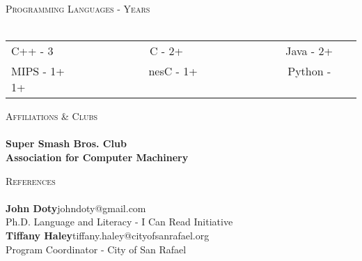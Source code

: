 \documentclass[a4paper]{article}
\newcommand{\lineunder} {
    \vspace*{-8pt} \\
    \hspace*{-18pt} \hrulefill \\
}
\newcommand{\header} [1] {
    {\hspace*{-18pt}\vspace*{6pt} \textsc{#1}}
    \vspace*{-6pt} \lineunder
}
\begin{document}
\header{Programming Languages - Years}
\begin{tabular}{ l l }
	C++ - 3 $\>$ $\>$ $\>$ $\>$ $\>$ $\>$ $\>$ $\>$ $\>$ $\>$ $\>$ $\>$ $\>$ $\>$ $\>$ C - 2+ $\>$ $\>$ $\>$ $\>$ $\>$ $\>$ $\>$ $\>$ $\>$ $\>$ $\>$ $\>$ $\>$ $\>$ $\>$ $\>$ Java - 2+ \\
	MIPS - 1+ $\>$ $\>$ $\>$ $\>$ $\>$ $\>$ $\>$ $\>$  $\>$ $\>$ $\>$ $\>$ $\>$ nesC - 1+ $\>$ $\>$ $\>$ $\>$ $\>$ $\>$ $\>$ $\>$ $\>$ $\>$ $\>$ $\>$ $\>$ $\>$ Python - 1+ \\
\end{tabular}
\vspace{3mm}

\header{Affiliations \& Clubs}

\vspace*{2mm}
\textbf{Super Smash Bros. Club}\\

\vspace*{2mm}
\textbf{Association for Computer Machinery}\\

\vspace*{2mm}



\header{References}
\textbf{John Doty}\hfill johndoty@gmail.com\\
Ph.D. Language and Literacy - I Can Read Initiative\\
\vspace{3mm}
\textbf{Tiffany Haley}\hfill tiffany.haley@cityofsanrafael.org\\
Program Coordinator - City of San Rafael\\
\vspace{3mm}
\end{document}
